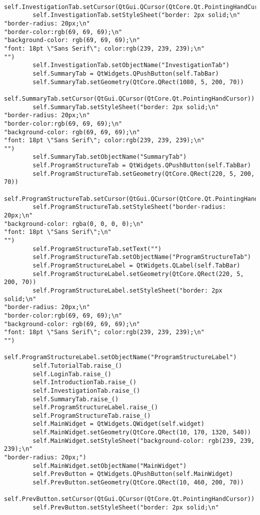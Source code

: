 \documentclass{article}
\begin{document}
\begin{lstlisting}
        self.InvestigationTab.setCursor(QtGui.QCursor(QtCore.Qt.PointingHandCursor))
        self.InvestigationTab.setStyleSheet("border: 2px solid;\n"
"border-radius: 20px;\n"
"border-color:rgb(69, 69, 69);\n"
"background-color: rgb(69, 69, 69);\n"
"font: 18pt \"Sans Serif\"; color:rgb(239, 239, 239);\n"
"")
        self.InvestigationTab.setObjectName("InvestigationTab")
        self.SummaryTab = QtWidgets.QPushButton(self.TabBar)
        self.SummaryTab.setGeometry(QtCore.QRect(1080, 5, 200, 70))
        self.SummaryTab.setCursor(QtGui.QCursor(QtCore.Qt.PointingHandCursor))
        self.SummaryTab.setStyleSheet("border: 2px solid;\n"
"border-radius: 20px;\n"
"border-color:rgb(69, 69, 69);\n"
"background-color: rgb(69, 69, 69);\n"
"font: 18pt \"Sans Serif\"; color:rgb(239, 239, 239);\n"
"")
        self.SummaryTab.setObjectName("SummaryTab")
        self.ProgramStructureTab = QtWidgets.QPushButton(self.TabBar)
        self.ProgramStructureTab.setGeometry(QtCore.QRect(220, 5, 200, 70))
        self.ProgramStructureTab.setCursor(QtGui.QCursor(QtCore.Qt.PointingHandCursor))
        self.ProgramStructureTab.setStyleSheet("border-radius: 20px;\n"
"background-color: rgba(0, 0, 0, 0);\n"
"font: 18pt \"Sans Serif\";\n"
"")
        self.ProgramStructureTab.setText("")
        self.ProgramStructureTab.setObjectName("ProgramStructureTab")
        self.ProgramStructureLabel = QtWidgets.QLabel(self.TabBar)
        self.ProgramStructureLabel.setGeometry(QtCore.QRect(220, 5, 200, 70))
        self.ProgramStructureLabel.setStyleSheet("border: 2px solid;\n"
"border-radius: 20px;\n"
"border-color:rgb(69, 69, 69);\n"
"background-color: rgb(69, 69, 69);\n"
"font: 18pt \"Sans Serif\"; color:rgb(239, 239, 239);\n"
"")
        self.ProgramStructureLabel.setObjectName("ProgramStructureLabel")
        self.TutorialTab.raise_()
        self.LoginTab.raise_()
        self.IntroductionTab.raise_()
        self.InvestigationTab.raise_()
        self.SummaryTab.raise_()
        self.ProgramStructureLabel.raise_()
        self.ProgramStructureTab.raise_()
        self.MainWidget = QtWidgets.QWidget(self.widget)
        self.MainWidget.setGeometry(QtCore.QRect(10, 170, 1320, 540))
        self.MainWidget.setStyleSheet("background-color: rgb(239, 239, 239);\n"
"border-radius: 20px;")
        self.MainWidget.setObjectName("MainWidget")
        self.PrevButton = QtWidgets.QPushButton(self.MainWidget)
        self.PrevButton.setGeometry(QtCore.QRect(10, 460, 200, 70))
        self.PrevButton.setCursor(QtGui.QCursor(QtCore.Qt.PointingHandCursor))
        self.PrevButton.setStyleSheet("border: 2px solid;\n"

\end{lstlisting}
\end{document}

